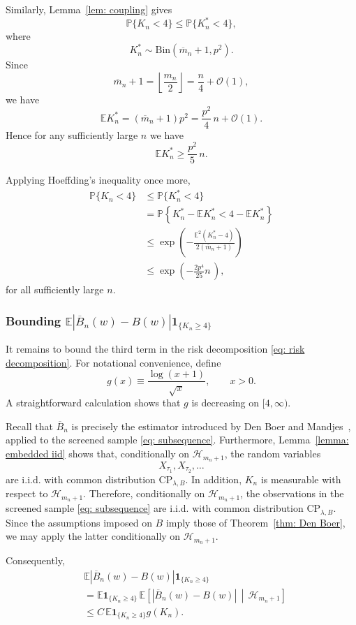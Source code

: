 \documentclass[12pt]{article}
\newcommand{\1}{\mathbf{1}}
\begin{document}
Similarly, Lemma~\ref{lem: coupling} gives
\[
\mathbb P\{K_n<4\}
\le
\mathbb P\{K_n^*<4\},
\]
where
\[
K_n^*
\sim
\mathrm{Bin}(\overline m_n+1,p^2).
\]
Since
\[
\overline m_n+1
=
\left\lfloor\frac{m_n}{2}\right\rfloor
=
\frac{n}{4}+\mathcal O(1),
\]
we have
\[
\mathbb EK_n^*
=
(\overline m_n+1)p^2
=
\frac{p^2}{4}\,n+\mathcal O(1).
\]
Hence for any sufficiently large $n$ we have
\[
\mathbb EK_n^*
\ge
\frac{p^2}{5}\,n.
\]

Applying Hoeffding's inequality once more,
\begin{align*}
\mathbb P\{K_n<4\}
&
\le
\mathbb P\{K_n^*<4\}
\\
&
=
\mathbb P\!\left\{
K_n^*-\mathbb EK_n^*
<
4-\mathbb EK_n^*
\right\}
\\
&
\le
\exp\!\left(
-\frac{\mathbb E^2(K_n^*-4)}
{2(\overline m_n+1)}
\right)
\\
&
\le
\exp\!\left(
-\frac{2p^4}{25}n\,
\right),
\end{align*}
for all sufficiently large $n$.

\subsubsection{Bounding $\mathbb E
|\overline B_n(w)-B(w)|
\mathbf1_{\{K_n\ge4\}}
$}

It remains to bound the third term in the risk decomposition
\eqref{eq: risk decomposition}.
For notational convenience, define
\[
g(x)\equiv
\frac{\log(x+1)}{\sqrt{x}},
\qquad
x>0.
\]
A straightforward calculation shows that
$g$
is decreasing on
$[4,\infty)$.

Recall that
$\overline B_n$
is precisely the estimator introduced by
Den Boer and Mandjes~\cite{Den Boer2017},
applied to the screened sample
\eqref{eq: subsequence}.
Furthermore,
Lemma~\ref{lemma: embedded iid}
shows that, conditionally on
$\mathcal H_{m_n+1}$,
the random variables
\[
X_{\tau_1},X_{\tau_2},
\ldots
\]
are i.i.d. with common distribution
$\mathrm{CP}_{\lambda,B}$. In addition, $K_n$ is measurable with respect to $\mathcal{H}_{m_n+1}$. Therefore, conditionally on
$\mathcal H_{m_n+1}$,
the observations in the screened sample \eqref{eq: subsequence} are i.i.d. with common distribution
$\mathrm{CP}_{\lambda,B}$. 
Since the assumptions imposed on
$B$
imply those of
Theorem~\ref{thm: Den Boer},
we may apply the latter conditionally on
$\mathcal H_{m_n+1}$.

Consequently,
\begin{align}
&
\mathbb E
|\overline B_n(w)-B(w)|
\mathbf1_{\{K_n\ge4\}}
\nonumber
\\
&
=
\mathbb E\mathbf1_{\{K_n\ge4\}}
\,
\mathbb E\left[
|\overline B_n(w)-B(w)|
\,\middle|\,
\mathcal H_{m_n+1}
\right]
\nonumber
\\
&
\le
C
\,
\mathbb E
\mathbf1_{\{K_n\ge4\}}
g(K_n).
\label{eq: second term 1}
\end{align}
\end{document}

